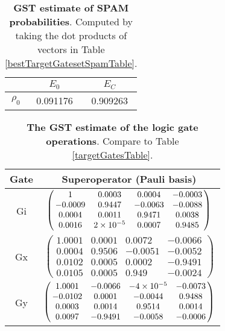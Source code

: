 {\begin{table}[h]
\begin{center}
\begin{tabular}[l]{|c|c|c|}
\hline
 & $E_{0}$ & $E_C$ \\ \hline
$\rho_{0}$ & 0.091176 & 0.909263 \\ \hline
\end{tabular}

\caption{\textbf{GST estimate of SPAM probabilities}.  Computed by taking the dot products of vectors in Table \ref{bestTargetGatesetSpamTable}.\label{bestTargetGatesetSpamParametersTable}}
\end{center}
\end{table}

\begin{table}[h]
\begin{center}
\begin{tabular}[l]{|c|c|}
\hline
Gate & Superoperator (Pauli basis) \\ \hline
Gi & $ \left(\!\!\begin{array}{cccc}
1 & 0.0003 & 0.0004 & -0.0003 \\ 
-0.0009 & 0.9447 & -0.0063 & -0.0088 \\ 
0.0004 & 0.0011 & 0.9471 & 0.0038 \\ 
0.0016 & 2\times 10^{-5} & 0.0007 & 0.9485
 \end{array}\!\!\right) $
 \\ \hline
Gx & $ \left(\!\!\begin{array}{cccc}
1.0001 & 0.0001 & 0.0072 & -0.0066 \\ 
0.0004 & 0.9506 & -0.0051 & -0.0052 \\ 
0.0102 & 0.0005 & 0.0002 & -0.9491 \\ 
0.0105 & 0.0005 & 0.949 & -0.0024
 \end{array}\!\!\right) $
 \\ \hline
Gy & $ \left(\!\!\begin{array}{cccc}
1.0001 & -0.0066 & -4\times 10^{-5} & -0.0073 \\ 
-0.0102 & 0.0001 & -0.0044 & 0.9488 \\ 
0.0003 & 0.0014 & 0.9514 & 0.0014 \\ 
0.0097 & -0.9491 & -0.0058 & -0.0006
 \end{array}\!\!\right) $
 \\ \hline
\end{tabular}

\caption{\textbf{The GST estimate of the logic gate operations}.  Compare to Table \ref{targetGatesTable}.\label{bestTargetGatesetGatesTable}}
\end{center}
\end{table}

}
